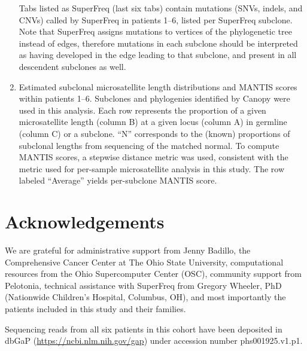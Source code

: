 \begin{enumerate}
	Tabs listed as SuperFreq (last six tabs) contain mutations (SNVs, indels, and CNVs) called by SuperFreq in patients 1--6, listed per SuperFreq subclone. Note that SuperFreq assigns mutations to vertices of the phylogenetic tree instead of edges, therefore mutations in each subclone should be interpreted as having developed in the edge leading to that subclone, and present in all descendent subclones as well.
    \item Estimated subclonal microsatellite length distributions and MANTIS scores within patients 1--6. Subclones and phylogenies identified by Canopy were used in this analysis. Each row represents the proportion of a given microsatellite length (column B) at a given locus (column A) in germline (column C) or a subclone. ``N'' corresponds to the (known) proportions of subclonal lengths from sequencing of the matched normal. To compute MANTIS scores, a stepwise distance metric was used, consistent with the metric used for per-sample microsatellite analysis in this study. The row labeled ``Average'' yields per-subclone MANTIS score.
\end{enumerate}

\section*{Acknowledgements}
We are grateful for administrative support from Jenny Badillo, the Comprehensive Cancer Center at The Ohio State University, computational resources from the Ohio Supercomputer Center (OSC), community support from Pelotonia, technical assistance with SuperFreq from Gregory Wheeler, PhD (Nationwide Children's Hospital, Columbus, OH), and most importantly the patients included in this study and their families.

Sequencing reads from all six patients in this cohort have been deposited in dbGaP (\url{https://ncbi.nlm.nih.gov/gap}) under accession number phs001925.v1.p1.
